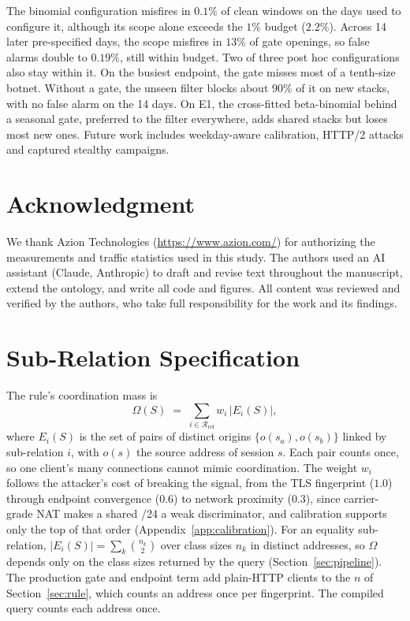 \documentclass[conference,letterpaper,10pt]{IEEEtran}
\newcommand\1{\textit{(i)}}
\newcommand\2{\textit{(ii)}}
\newcommand\3{\textit{(iii)}}
\newcommand\4{\textit{(iv)}}
\newcommand\5{\textit{(v)}}
\newcommand\6{\textit{(vi)}}
\newcommand\7{\textit{(vii)}}
\newcommand\8{\textit{(viii)}}
\newcommand\9{\textit{(ix)}}
\begin{document}
The binomial configuration misfires in $0.1\%$ of clean
windows on the days used to configure it, although
its scope alone exceeds the $1\%$ budget ($2.2\%$).
Across 14 later pre-specified days, the scope misfires in
$13\%$ of gate openings, so false alarms double to $0.19\%$,
still within budget. Two of three post hoc configurations
also stay within it.
On the busiest endpoint, the gate misses most of a
tenth-size botnet. Without a gate, the unseen filter blocks
about $90\%$ of it on new stacks, with no false alarm on the
14 days. On E1, the cross-fitted beta-binomial behind a
seasonal gate, preferred to the filter everywhere, adds
shared stacks but loses most new ones.
Future work includes weekday-aware calibration, HTTP/2
attacks and captured stealthy campaigns.

\section*{Acknowledgment}

We thank Azion Technologies (\url{https://www.azion.com/})
for authorizing the measurements and traffic statistics
used in this study. The authors used an AI assistant
(Claude, Anthropic) to draft and revise text throughout
the manuscript, extend the ontology, and write all code and
figures. All content was reviewed and verified
by the authors, who take full responsibility for the
work and its findings.




\appendices

\section{Sub-Relation Specification}
\label{app:algorithms}

The rule's coordination mass is \begin{equation} \Omega(S) \;=\; \sum_{i \in \mathcal{R}_{\mathrm{rel}}} w_i \,\big|E_i(S)\big| , \label{eq:omega} \end{equation} where $E_i(S)$ is the set of pairs of distinct origins $\{o(s_a), o(s_b)\}$ linked by sub-relation $i$, with $o(s)$ the source address of session $s$. Each pair counts once, so one client's many connections cannot mimic coordination. The weight $w_i$ follows the attacker's cost of breaking the signal, from the TLS fingerprint ($1.0$) through endpoint convergence ($0.6$) to network proximity ($0.3$), since carrier-grade NAT makes a shared /24 a weak discriminator, and calibration supports only the top of that order (Appendix~\ref{app:calibration}). For an equality sub-relation, $|E_i(S)| = \sum_k \binom{n_k}{2}$ over class sizes $n_k$ in distinct addresses, so $\Omega$ depends only on the class sizes returned by the query (Section~\ref{sec:pipeline}). The production gate and endpoint term add plain-HTTP clients to the $n$ of Section~\ref{sec:rule}, which counts an address once per fingerprint. The compiled query counts each address once.
\end{document}
